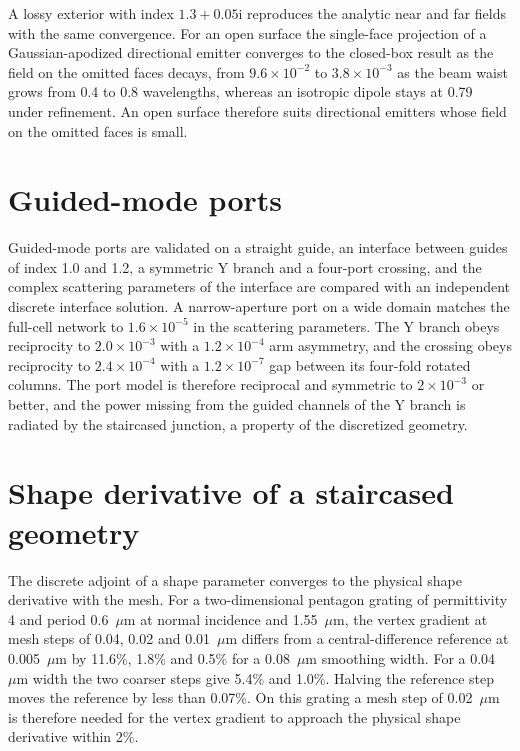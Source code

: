 \documentclass[11pt,a4paper]{article}
\newcommand{\micron}{\ensuremath{\mu\mathrm{m}}}
\begin{document}
A lossy exterior with index $1.3+0.05\mathrm{i}$ reproduces the analytic near and far fields with the same convergence. For an open surface the single-face projection of a Gaussian-apodized directional emitter converges to the closed-box result as the field on the omitted faces decays, from $9.6\times10^{-2}$ to $3.8\times10^{-3}$ as the beam waist grows from 0.4 to 0.8 wavelengths, whereas an isotropic dipole stays at 0.79 under refinement. An open surface therefore suits directional emitters whose field on the omitted faces is small.

\section{Guided-mode ports}
\label{si:ports}

Guided-mode ports are validated on a straight guide, an interface between guides of index 1.0 and 1.2, a symmetric Y branch and a four-port crossing, and the complex scattering parameters of the interface are compared with an independent discrete interface solution. A narrow-aperture port on a wide domain matches the full-cell network to $1.6\times10^{-5}$ in the scattering parameters. The Y branch obeys reciprocity to $2.0\times10^{-3}$ with a $1.2\times10^{-4}$ arm asymmetry, and the crossing obeys reciprocity to $2.4\times10^{-4}$ with a $1.2\times10^{-7}$ gap between its four-fold rotated columns. The port model is therefore reciprocal and symmetric to $2\times10^{-3}$ or better, and the power missing from the guided channels of the Y branch is radiated by the staircased junction, a property of the discretized geometry.

\section{Shape derivative of a staircased geometry}
\label{si:shape}

The discrete adjoint of a shape parameter converges to the physical shape derivative with the mesh. For a two-dimensional pentagon grating of permittivity 4 and period 0.6~\micron{} at normal incidence and 1.55~\micron{}, the vertex gradient at mesh steps of 0.04, 0.02 and 0.01~\micron{} differs from a central-difference reference at 0.005~\micron{} by 11.6\%, 1.8\% and 0.5\% for a 0.08~\micron{} smoothing width. For a 0.04~\micron{} width the two coarser steps give 5.4\% and 1.0\%. Halving the reference step moves the reference by less than 0.07\%. On this grating a mesh step of 0.02~\micron{} is therefore needed for the vertex gradient to approach the physical shape derivative within 2\%.
\end{document}
